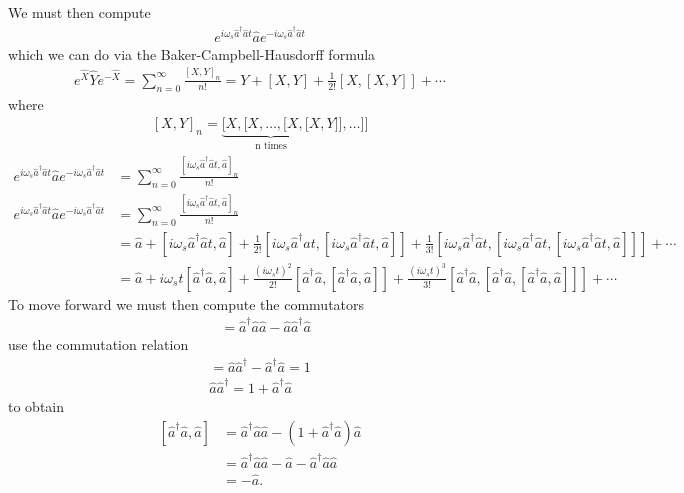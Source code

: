 \documentclass[aps,pra,showpacs,amsmath,amssymb,nofootinbib,longbibliography,superscriptaddress
]{revtex4-1}
\theoremstyle{definition}
\theoremstyle{remark}
\newcommand{\0}{\hat{0}}
\begin{document}
We must then compute
\begin{align}
    e^{i\omega_s \hat{a}^{\dagger} \hat{a}t} \hat{a} e^{-i\omega_s \hat{a}^{\dagger} \hat{a}t}
\end{align}
which we can do via the Baker-Campbell-Hausdorff formula
\begin{align}
    e^{\hat{X}} \hat{Y} e^{-\hat{X}} = \sum_{n=0}^{\infty} \frac{{[X, Y]}_n}{n!} = Y + [X, Y] + \frac{1}{2!}[X, [X, Y]] + \cdots
\end{align}
where
\begin{align}
    {[X, Y]}_n = \underbrace{[X, [X, \ldots, [X, [X}_{\text{n times}}, Y]], \ldots]]
\end{align}
\begin{align}
    e^{i\omega_s \hat{a}^{\dagger} \hat{a}t} \hat{a} e^{-i\omega_s \hat{a}^{\dagger} \hat{a}t} &= \sum_{n=0}^{\infty} \frac{{[i\omega_s \hat{a}^{\dagger} \hat{a}t, \hat{a}]}_n}{n!} \nonumber \\
    e^{i\omega_s \hat{a}^{\dagger} \hat{a}t} \hat{a} e^{-i\omega_s \hat{a}^{\dagger} \hat{a}t} &= \sum_{n=0}^{\infty} \frac{{[i\omega_s \hat{a}^{\dagger} \hat{a}t, \hat{a}]}_n}{n!} \nonumber \\
    &= \hat{a} + [i\omega_s \hat{a}^{\dagger} \hat{a}t, \hat{a}] + \frac{1}{2!}[i\omega_s \hat{a}^{\dagger} \hat{a}t, [i\omega_s \hat{a}^{\dagger} \hat{a}t, \hat{a}]] + \frac{1}{3!}[i\omega_s \hat{a}^{\dagger} \hat{a}t, [i\omega_s \hat{a}^{\dagger} \hat{a}t, [i\omega_s \hat{a}^{\dagger} \hat{a}t, \hat{a}]]] + \cdots \nonumber \\
    &= \hat{a} + i \omega_s t [\hat{a}^{\dagger} \hat{a}, \hat{a}] + \frac{(i \omega_s t)^2}{2!} [\hat{a}^{\dagger} \hat{a}, [\hat{a}^{\dagger} \hat{a}, \hat{a}]] + \frac{(i \omega_s t)^3}{3!}[\hat{a}^{\dagger} \hat{a}, [\hat{a}^{\dagger} \hat{a}, [\hat{a}^{\dagger} \hat{a}, \hat{a}]]] + \cdots
\end{align}
To move forward we must then compute the commutators
\begin{align}
    [\hat{a}^{\dagger} \hat{a}, \hat{a}] &=
    \hat{a}^{\dagger} \hat{a} \hat{a} - \hat{a} \hat{a}^{\dagger} \hat{a} \nonumber
\end{align}
use the commutation relation
\begin{align}
    [\hat{a}, \hat{a}^{\dagger}] = \hat{a} \hat{a}^{\dagger} - \hat{a}^{\dagger} \hat{a} = 1 \nonumber\\
    \hat{a} \hat{a}^{\dagger} = 1 + \hat{a}^{\dagger} \hat{a}
\end{align}
to obtain
\begin{align}\label{aaacommutator}
    [\hat{a}^{\dagger} \hat{a}, \hat{a}] &= \hat{a}^{\dagger} \hat{a} \hat{a} - (1 + \hat{a}^{\dagger} \hat{a}) \hat{a} \nonumber \\
    &= \hat{a}^{\dagger} \hat{a} \hat{a} - \hat{a} - \hat{a}^{\dagger} \hat{a}\hat{a} \nonumber \\
    &= - \hat{a}.
\end{align}
\end{document}
